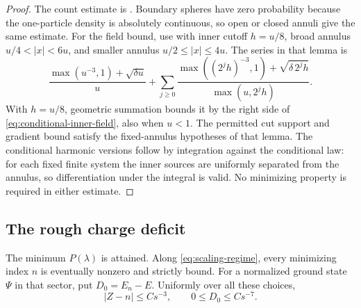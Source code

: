 \begin{proof}
The count estimate is \cite[\FAnnularCount]{Foundation}.  Boundary spheres
have zero probability because the one-particle density is absolutely
continuous, so open or closed annuli give the same estimate.  For the field
bound, use \cite[\FInnerField]{Foundation} with inner cutoff $h=u/8$, broad
annulus $u/4<|x|<6u$, and smaller annulus $u/2\le|x|\le4u$.
The series in that lemma is
\[
 \frac{\max(u^{-3},1)+\sqrt{\delta u}}u
 +\sum_{j\ge0}
       \frac{\max((2^jh)^{-3},1)+\sqrt{\delta\,2^jh}}
            {\max(u,2^jh)}.
\]
With $h=u/8$, geometric summation bounds it by the right side of
\cref{eq:conditional-inner-field}, also when $u<1$.  The permitted cut
support and gradient bound satisfy the fixed-annulus hypotheses of that
lemma.  The conditional harmonic versions follow by integration against
the conditional law: for each fixed finite system the inner sources are
uniformly separated from the annulus, so differentiation under the integral
is valid.  No minimizing property is required in either estimate.
\end{proof}

\subsection{The rough charge deficit}

\begin{lemma}\label{lem:priced-rough}
The minimum $P(\lambda)$ is attained.  Along \cref{eq:scaling-regime}, every
minimizing index $n$ is eventually nonzero and strictly bound.  For a
normalized ground state $\Psi$ in that sector, put $D_0=E_n-E$.  Uniformly
over all these choices,
\begin{equation}\label{eq:rough-deficit}
 |Z-n|\le Cs^{-3},\qquad 0\le D_0\le Cs^{-7}.
\end{equation}
\end{lemma}

